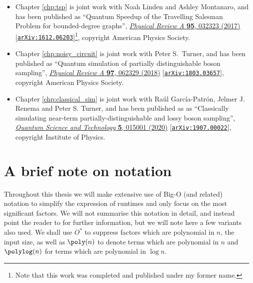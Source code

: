 \begin{itemize}
\item Chapter \ref{chp:tsp} is joint work with Noah Linden and Ashley Montanaro, and has been published as ``Quantum Speedup of the Travelling Salesman Problem for bounded-degree graphs'', \href{https://link.aps.org/doi/10.1103/PhysRevA.95.032323}{\textit{Physical Review A} \textbf{95}, 032323 (2017)} [{\tt \href{https://arxiv.org/abs/1612.06203}{arXiv:1612.06203}}]\footnote{Note that this work was completed and published under my former name.}, copyright American Physics Society.

\item Chapter \ref{chp:noisy_circuit} is joint work with Peter S.\ Turner, and has been published as ``Quantum simulation of partially distinguishable boson sampling'', \href{https://link.aps.org/doi/10.1103/PhysRevA.97.062329}{\textit{Physical Review A} \textbf{97}, 062329 (2018)} [{\tt \href{https://arxiv.org/abs/1803.03657}{arXiv:1803.03657}}], copyright American Physics Society.

\item Chapter \ref{chp:classical_sim} is joint work with Ra\'{u}l Garc\'{i}a-Patr\'{o}n, Jelmer J. Renema and Peter S. Turner, and has been published as as ``Classically simulating near-term partially-distinguishable and lossy boson sampling'', \href{https://iopscience.iop.org/article/10.1088/2058-9565/ab5555}{\textit{Quantum Science and Technology} \textbf{5}, 015001 (2020)} [{\tt \href{https://arxiv.org/abs/1907.00022}{arXiv:1907.00022}}], copyright Institute of Physics.
\end{itemize}

\section{A brief note on notation}
\label{sec:notation}

Throughout this thesis we will make extensive use of Big-O (and related) notation to simplify the expression of runtimes and only focus on the most significant factors. We will not summarise this notation in detail, and instead point the reader to \cite{clrs} for further information, but we will note here a few variants also used. We shall use $O^*$ to suppress factors which are polynomial in $n$, the input size, as well as $\poly(n)$ to denote terms which are polynomial in $n$ and $\polylog(n)$ for terms which are polynomial in $\log n$.

